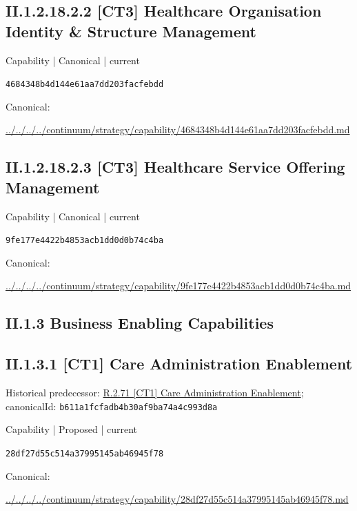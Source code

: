 \documentclass[10pt,a4paper]{article}
\begin{document}
\subsection*{II.1.2.18.2.2 [CT3] Healthcare Organisation Identity \& Structure Management}
\label{element-4684348b4d144e61aa7dd203facfebdd}
{\small Capability | Canonical | current}\par
\texttt{4684348b4d144e61aa7dd203facfebdd}\par
Canonical: \par
{\footnotesize\url{../../../../continuum/strategy/capability/4684348b4d144e61aa7dd203facfebdd.md}}\par
\subsection*{II.1.2.18.2.3 [CT3] Healthcare Service Offering Management}
\label{element-9fe177e4422b4853acb1dd0d0b74c4ba}
{\small Capability | Canonical | current}\par
\texttt{9fe177e4422b4853acb1dd0d0b74c4ba}\par
Canonical: \par
{\footnotesize\url{../../../../continuum/strategy/capability/9fe177e4422b4853acb1dd0d0b74c4ba.md}}\par
\subsection*{II.1.3 Business Enabling Capabilities}
\subsection*{II.1.3.1 [CT1] Care Administration Enablement}
Historical predecessor: \hyperref[element-b611a1fcfadb4b30af9ba74a4c993d8a]{R.2.71 [CT1] Care Administration Enablement}; canonicalId: \texttt{b611a1fcfadb4b30af9ba74a4c993d8a}\par
\label{element-28df27d55c514a37995145ab46945f78}
{\small Capability | Proposed | current}\par
\texttt{28df27d55c514a37995145ab46945f78}\par
Canonical: \par
{\footnotesize\url{../../../../continuum/strategy/capability/28df27d55c514a37995145ab46945f78.md}}\par
\end{document}
